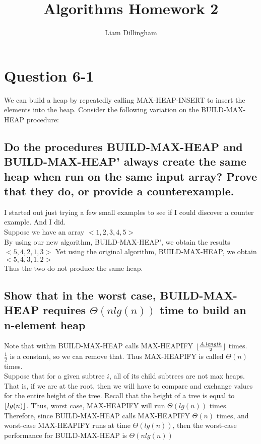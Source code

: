 \documentclass[20pt]{article} %
\title{Algorithms Homework 2}
\author{Liam Dillingham}
\DeclarePairedDelimiter\floor{\lfloor}{\rfloor}
\begin{document}
\maketitle

\section{Question 6-1}
We can build a heap by repeatedly calling MAX-HEAP-INSERT to insert the elements into the heap. Consider the following variation on the BUILD-MAX-HEAP procedure:

\subsection{Do the procedures BUILD-MAX-HEAP and BUILD-MAX-HEAP' always create the same heap when run on the same input array? Prove that they do, or provide a counterexample.}

I started out just trying a few small examples to see if I could discover a counter example.  And I did. \\
Suppose we have an array $<1,2,3,4,5>$ \\
By using our new algorithm, BUILD-MAX-HEAP', we obtain the results $<5,4,2,1,3>$
Yet using the original algorithm, BUILD-MAX-HEAP, we obtain $<5,4,3,1,2>$ \\
Thus the two do not produce the same heap.

\subsection{Show that in the worst case, BUILD-MAX-HEAP requires $\Theta(n lg(n))$ time to build an n-element heap}

Note that within BUILD-MAX-HEAP calls MAX-HEAPIFY $\floor{\frac{A.length}{2}}$ times. \\ 
$\frac{1}{2}$ is a constant, so we can remove that.  Thus MAX-HEAPIFY is called $\Theta(n)$ times. \\ 

Suppose that for a given subtree $i$, all of its child subtrees are not max heaps.  That is, if we are at the root, then we will have to compare and exchange values for the entire height of the tree.  Recall that the height of a tree is equal to $\floor{lg(n)}$. Thus, worst case, MAX-HEAPIFY will run $\Theta(lg(n))$ times. \\ 

Therefore, since BUILD-MAX-HEAP calls MAX-HEAPIFY $\Theta(n)$ times, and worst-case MAX-HEAPIFY runs at time $\Theta(lg(n))$, then the worst-case performance for BUILD-MAX-HEAP is $\Theta(nlg(n))$  
\end{document}
